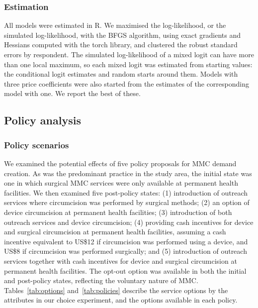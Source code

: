 \documentclass[11pt]{article}
\numberwithin{equation}{section}\numberwithin{figure}{section}\numberwithin{table}{section}
\begin{document}
\subsubsection{Estimation}
All models were estimated in R. We maximised the log-likelihood, or the simulated log-likelihood, with the BFGS algorithm, using exact gradients and Hessians computed with the \textsf{torch} library, and clustered the robust standard errors by respondent. The simulated log-likelihood of a mixed logit can have more than one local maximum, so each mixed logit was estimated from \mmcMXstartsOne{} starting values: the conditional logit estimates and random starts around them. Models with three price coefficients were also started from the estimates of the corresponding model with one. We report the best of these.

\subsection{Policy analysis}
\subsubsection{Policy scenarios}
We examined the potential effects of five policy proposals for MMC demand creation. As was the predominant practice in the study area, the initial state was one in which surgical MMC services were only available at permanent health facilities. We then examined five post-policy states: (1) introduction of outreach services where circumcision was performed by surgical methods; (2) an option of device circumcision at permanent health facilities; (3) introduction of both outreach services and device circumcision; (4) providing cash incentives for device and surgical circumcision at permanent health facilities, assuming a cash incentive equivalent to US\$12 if circumcision was performed using a device, and US\$8 if circumcision was performed surgically; and (5) introduction of outreach services together with cash incentives for device and surgical circumcision at permanent health facilities. The opt-out option was available in both the initial and post-policy states, reflecting the voluntary nature of MMC. Tables~\ref{tab:options} and~\ref{tab:policies} describe the service options by the attributes in our choice experiment, and the options available in each policy.

\begin{table}[!htbp]
\centering
\caption{Service options in the policy scenarios, by the attributes in the choice experiment.}\label{tab:options}
\small
{}
\end{table}
\end{document}

